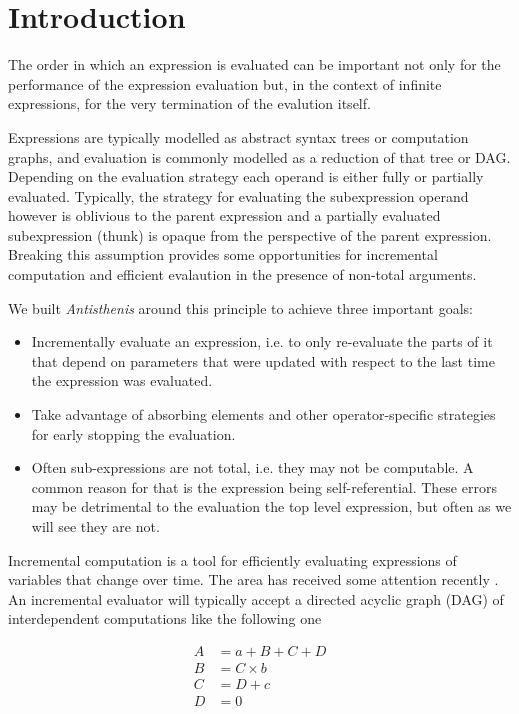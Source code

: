 \section{Introduction}
\label{sec:antisthenis_intro}

The order in which an expression is evaluated can be important not
only for the performance of the expression evaluation but, in the
context of infinite expressions, for the very termination of the
evalution itself.

Expressions are typically modelled as abstract syntax trees or
computation graphs, and evaluation is commonly modelled as a reduction
of that tree or DAG. Depending on the evaluation strategy each operand
is either fully or partially evaluated. Typically, the strategy for
evaluating the subexpression operand however is oblivious to the
parent expression and a partially evaluated subexpression (thunk) is
opaque from the perspective of the parent expression. Breaking this
assumption provides some opportunities for incremental computation and
efficient evalaution in the presence of non-total arguments.

We built \emph{Antisthenis} around this principle to achieve three
important goals:

\begin{itemize}
\item Incrementally evaluate an expression, i.e. to only re-evaluate
  the parts of it that depend on parameters that were updated with
  respect to the last time the expression was evaluated.
\item Take advantage of absorbing elements and other operator-specific
  strategies for early stopping the evaluation.
\item Often sub-expressions are not total, i.e. they may not be
  computable. A common reason for that is the expression being
  self-referential. These errors may be detrimental to the evaluation
  the top level expression, but often as we will see they are not.
\end{itemize}

Incremental computation is a tool for efficiently evaluating
expressions of variables that change over time. The area has received
some attention recently
\cite{bhatotiaIncoopMapReduceIncremental2011,hammerAdaptonComposableDemanddriven2014a}. An
incremental evaluator will typically accept a directed acyclic graph
(DAG) of interdependent computations like the following one

\begin{align*}
A &= a + B + C + D  \\
B &= C \times b \\
C & = D + c \\
D &= 0
\end{align*}

